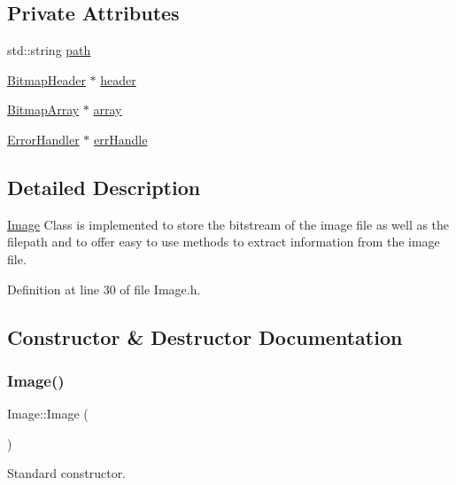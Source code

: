 \subsection*{Private Attributes}
\begin{DoxyCompactItemize}
\item 
std\+::string \mbox{\hyperlink{classImage_aec8a33f176362d146da8c058798ebbff}{path}}
\item 
\mbox{\hyperlink{classBitmapHeader}{Bitmap\+Header}} $\ast$ \mbox{\hyperlink{classImage_adaf72c2df8979eafb4031dc0384dc49f}{header}}
\item 
\mbox{\hyperlink{classBitmapArray}{Bitmap\+Array}} $\ast$ \mbox{\hyperlink{classImage_a1c18dd7d9eda416d44e7eb408d5b3c38}{array}}
\item 
\mbox{\hyperlink{classErrorHandler}{Error\+Handler}} $\ast$ \mbox{\hyperlink{classImage_a560753c20e67a544be57bba971021375}{err\+Handle}}
\end{DoxyCompactItemize}


\subsection{Detailed Description}
\mbox{\hyperlink{classImage}{Image}} Class is implemented to store the bitstream of the image file as well as the filepath and to offer easy to use methods to extract information from the image file. 

Definition at line 30 of file Image.\+h.



\subsection{Constructor \& Destructor Documentation}
\mbox{\label{classImage_a58edd1c45b4faeb5f789b0d036d02313}} 
\subsubsection{\texorpdfstring{Image()}{Image()}\hspace{0.1cm}{\footnotesize\ttfamily [1/3]}}
{\footnotesize\ttfamily Image\+::\+Image (\begin{DoxyParamCaption}{ }\end{DoxyParamCaption})}



Standard constructor. 



